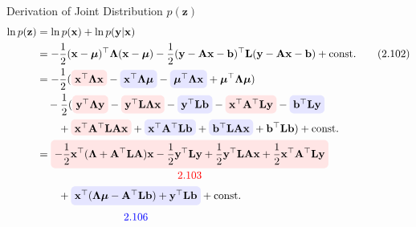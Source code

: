 \documentclass[10pt]{beamer}
\newcommand{\highlight}[2][yellow]{\tikz[baseline=(x.base)]{\node[rectangle,rounded corners,fill=#1!10](x){$#2$};}}
\newcommand{\highlightcap}[3][yellow]{\tikz[baseline=(x.base)]{\node[rectangle,rounded corners,fill=#1!10](x){$#2$} node[below of=x, node distance=2em, color=#1]{#3};}}
\begin{document}
    \begin{frame}{Derivation of Joint Distribution $p(\mathbf z)$}
        \begin{align*}
            \ln p(\mathbf z) 
            &= \ln p(\mathbf x) + \ln p(\mathbf y | \mathbf x) \\
            &= -\frac{1}{2}(\mathbf x - \bm\mu)^\top\bm\Lambda(\mathbf x - \bm\mu) 
            -\frac{1}{2}(\mathbf y - \mathbf A\mathbf x - \mathbf b)^\top\mathbf L(\mathbf y - \mathbf A\mathbf x - \mathbf b)
                + \mathrm{const.} \tag{2.102} \\
            &= -\frac{1}{2}(\highlight[red]{\mathbf x^\top\bm\Lambda\mathbf x} - \highlight[blue]{\mathbf x^\top\bm\Lambda\bm\mu} - \highlight[blue]{\bm\mu^\top\bm\Lambda\mathbf x} 
            + \bm\mu^\top\bm\Lambda\bm\mu) \\
            &\quad -\frac{1}{2}(\highlight[red]{\mathbf y^\top\bm\Lambda\mathbf y} - \highlight[red]{\mathbf y^\top\mathbf L\bm\Lambda\mathbf x} 
            - \highlight[blue]{\mathbf y^\top\mathbf L\mathbf b} - \highlight[red]{\mathbf x^\top\mathbf A^\top\mathbf L\mathbf y} 
            - \highlight[blue]{\mathbf b^\top\mathbf L\mathbf y} \\
            &\qquad + \highlight[red]{\mathbf x^\top\mathbf A^\top\mathbf L\mathbf A\mathbf x} + \highlight[blue]{\mathbf x^\top\mathbf A^\top\mathbf L\mathbf b}
                + \highlight[blue]{\mathbf b^\top\mathbf L\mathbf A\mathbf x} + \mathbf b^\top\mathbf L\mathbf b)+ \mathrm{const.} \\
            &= \highlightcap[red]{\displaystyle -\frac{1}{2}\mathbf x^\top(\bm\Lambda + \mathbf A^\top\mathbf L\mathbf A)\mathbf x
                -\frac{1}{2} \mathbf y^\top\mathbf L\mathbf y 
                +\frac{1}{2} \mathbf y^\top\mathbf L\mathbf A\mathbf x
                +\frac{1}{2} \mathbf x^\top\mathbf A^\top\mathbf L\mathbf y}{2.103} \\
            &\qquad + \highlightcap[blue]{\mathbf x^\top(\bm\Lambda\bm\mu - \mathbf A^\top\mathbf L\mathbf b) + \mathbf y^\top\mathbf L\mathbf b}{2.106} + \mathrm{const.}\\
        \end{align*}
    \end{frame}
\end{document}
